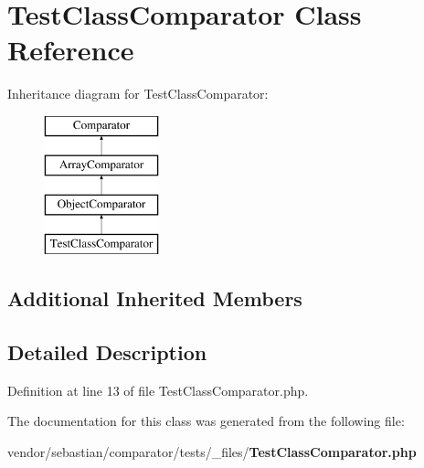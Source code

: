 \section{Test\+Class\+Comparator Class Reference}
\label{class_sebastian_bergmann_1_1_comparator_1_1_test_class_comparator}
Inheritance diagram for Test\+Class\+Comparator\+:\begin{figure}[H]
\begin{center}
\leavevmode
\includegraphics[height=4.000000cm]{class_sebastian_bergmann_1_1_comparator_1_1_test_class_comparator}
\end{center}
\end{figure}
\subsection*{Additional Inherited Members}


\subsection{Detailed Description}


Definition at line 13 of file Test\+Class\+Comparator.\+php.



The documentation for this class was generated from the following file\+:\begin{DoxyCompactItemize}
\item 
vendor/sebastian/comparator/tests/\+\_\+files/{\bf Test\+Class\+Comparator.\+php}\end{DoxyCompactItemize}
